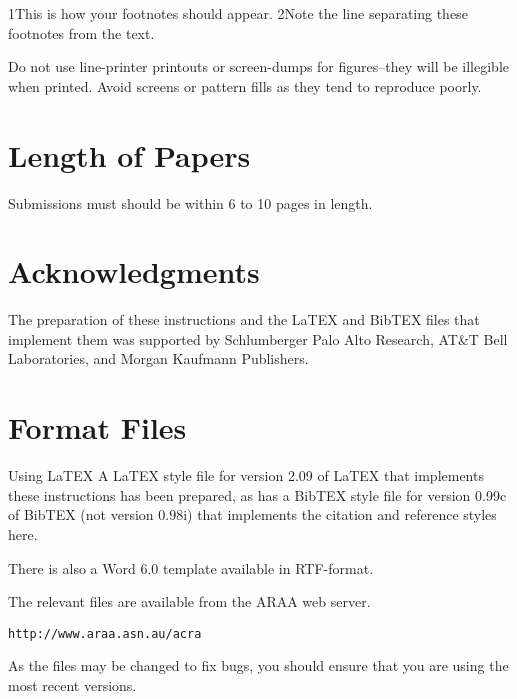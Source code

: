 \documentclass{article}
\begin{document}
1This is how your footnotes should appear. 2Note the line separating these footnotes from the text.

Do not use line-printer printouts or screen-dumps for figures--they will be illegible when printed. Avoid screens or pattern fills as they tend to reproduce poorly.

\section{Length of Papers} 
Submissions must should be within 6 to 10 pages in length. 

\section*{Acknowledgments}
The preparation of these instructions and the LaTEX and BibTEX files that implement them was supported by Schlumberger Palo Alto Research, AT\&T Bell Laboratories, and Morgan Kaufmann Publishers.

\section*{Format Files}
Using LaTEX A LaTEX style file for version 2.09 of LaTEX that implements these instructions has been prepared, as has a BibTEX style file for version 0.99c of BibTEX (not version 0.98i) that implements the citation and reference styles here.

There is also a Word 6.0 template available in RTF-format.

The relevant files are available from the ARAA web server.

\begin{center}
\begin{verbatim}
http://www.araa.asn.au/acra
\end{verbatim}
\end{center}

As the files may be changed to fix bugs, you should ensure that you are using the most recent versions.
\end{document}
